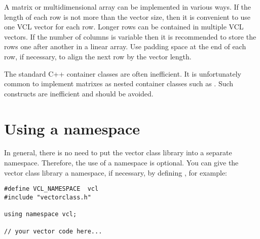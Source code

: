 \documentclass[vcl_manual.tex]{subfiles}
\begin{document}
A matrix or multidimensional array can be implemented in various ways. If the length of each row is not more than the vector size, then it is convenient to use one VCL vector for each row. Longer rows can be contained in multiple VCL vectors. If the number of columns is variable then it is recommended to store the rows one after another in a linear array. Use padding space at the end of each row, if necessary, to align the next row by the vector length. 

The standard C++ container classes are often inefficient. It is unfortunately common to implement matrixes as nested container classes such as . Such constructs are inefficient and should be avoided.


\section{Using a namespace} \label{UsingANamespace}

In general, there is no need to put the vector class library into a separate namespace. Therefore, the use of a namespace is optional. You can give the vector class library a namespace, if necessary, by defining , for example:

\begin{lstlisting}[frame=single]
#define VCL_NAMESPACE  vcl
#include "vectorclass.h"

using namespace vcl;

// your vector code here...
\end{lstlisting}
\end{document}
